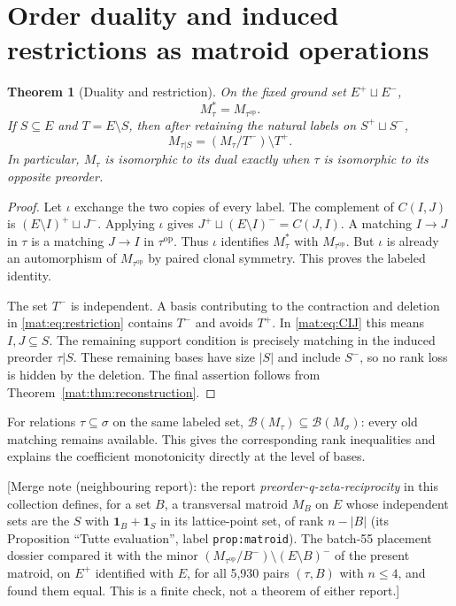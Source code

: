 \documentclass[11pt]{article}
\numberwithin{equation}{section}
\newtheorem{theorem}{Theorem}[section]
\theoremstyle{definition}
\newcommand{\one}{\mathbf 1}
\newcommand{\cB}{\mathcal B}
\begin{document}
\section{Order duality and induced restrictions as matroid operations}
\label{mat:sec:duality}
\begin{theorem}[Duality and restriction]\label{mat:thm:duality}
On the fixed ground set $E^+\sqcup E^-$,
\begin{equation}
 M_\tau^*=M_{\tau^{\mathrm{op}}}.
\label{mat:eq:dual}
\end{equation}
If $S\subseteq E$ and $T=E\setminus S$, then after retaining the natural
labels on $S^+\sqcup S^-$,
\begin{equation}
 M_{\tau|S}=(M_\tau/T^-)\setminus T^+.
\label{mat:eq:restriction}
\end{equation}
In particular, $M_\tau$ is isomorphic to its dual exactly when $\tau$ is
isomorphic to its opposite preorder.
\end{theorem}
\begin{proof}
Let $\iota$ exchange the two copies of every label. The complement of
$C(I,J)$ is $(E\setminus I)^+\sqcup J^-$. Applying $\iota$ gives
$J^+\sqcup(E\setminus I)^-=C(J,I)$. A matching $I\to J$ in $\tau$ is a
matching $J\to I$ in $\tau^{\mathrm{op}}$. Thus $\iota$ identifies
$M_\tau^*$ with $M_{\tau^{\mathrm{op}}}$. But $\iota$ is already an
automorphism of $M_{\tau^{\mathrm{op}}}$ by paired clonal symmetry. This
proves the labeled identity.

The set $T^-$ is independent. A basis contributing to the contraction and
deletion in \eqref{mat:eq:restriction} contains $T^-$ and avoids $T^+$.
In \eqref{mat:eq:CIJ} this means $I,J\subseteq S$. The remaining support
condition is precisely matching in the induced preorder $\tau|S$.
These remaining bases have size $|S|$ and include $S^-$, so no rank loss
is hidden by the deletion. The final assertion follows from
Theorem~\ref{mat:thm:reconstruction}.
\end{proof}

For relations $\tau\subseteq\sigma$ on the same labeled set,
$\cB(M_\tau)\subseteq\cB(M_\sigma)$: every old matching remains
available. This gives the corresponding rank inequalities and explains the
coefficient monotonicity directly at the level of bases.

[Merge note (neighbouring report): the report
\emph{preorder-q-zeta-reciprocity} in this collection defines, for a set $B$,
a transversal matroid $M_B$ on $E$ whose independent sets are the $S$ with
$\one_B+\one_S$ in its lattice-point set, of rank $n-|B|$ (its
Proposition ``Tutte evaluation'', label \texttt{prop:matroid}). The
batch-55 placement dossier compared it with the minor
$(M_{\tau^{\mathrm{op}}}/B^-)\setminus(E\setminus B)^-$ of the present
matroid, on $E^+$ identified with $E$, for all 5,930 pairs $(\tau,B)$ with
$n\le4$, and found them equal. This is a finite check, not a theorem of
either report.]
\end{document}
